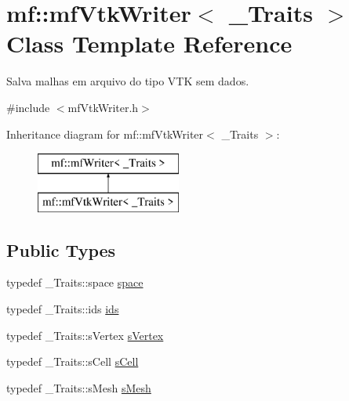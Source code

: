 \hypertarget{classmf_1_1mfVtkWriter}{
\section{mf::mfVtkWriter$<$ \_\-Traits $>$ Class Template Reference}
\label{classmf_1_1mfVtkWriter}
}


Salva malhas em arquivo do tipo VTK sem dados.  




{\ttfamily \#include $<$mfVtkWriter.h$>$}

Inheritance diagram for mf::mfVtkWriter$<$ \_\-Traits $>$:\begin{figure}[H]
\begin{center}
\leavevmode
\includegraphics[height=2.000000cm]{classmf_1_1mfVtkWriter}
\end{center}
\end{figure}
\subsection*{Public Types}
\begin{DoxyCompactItemize}
\item 
typedef \_\-Traits::space \hyperlink{classmf_1_1mfVtkWriter_ad618b138c53f1ac5faf9d2221665ee2d}{space}
\item 
typedef \_\-Traits::ids \hyperlink{classmf_1_1mfVtkWriter_af3a5d3d8c256dfd6eb0556c1591d078f}{ids}
\item 
typedef \_\-Traits::sVertex \hyperlink{classmf_1_1mfVtkWriter_a00d2e1afad50ca3b8d7cc7b8d3302f39}{sVertex}
\item 
typedef \_\-Traits::sCell \hyperlink{classmf_1_1mfVtkWriter_aa06d44e52fcb4460ee77862f62bffd42}{sCell}
\item 
typedef \_\-Traits::sMesh \hyperlink{classmf_1_1mfVtkWriter_a0627a25b5da983842978040d92539e9e}{sMesh}
\end{DoxyCompactItemize}
